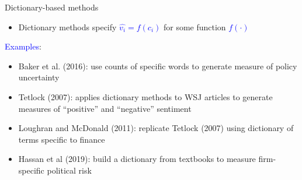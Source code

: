 \documentclass[english]{beamer}
\begin{document}
\begin{frame}{Dictionary-based methods}
\begin{itemize}
\setlength{\itemsep}{1em}
\item Dictionary methods specify \textcolor{blue}{$\hat{v_i}=f (c_i)$} for some function \textcolor{blue}{$f(\cdot)$}

\end{itemize}

\vspace{12pt}

\textcolor{blue}{Examples}:

\vspace{7pt}

\begin{itemize}
\setlength{\itemsep}{1em}

\item Baker et al. (2016): use counts of specific words to generate measure of policy uncertainty

\item Tetlock (2007): applies dictionary methods to WSJ articles to generate measures of ``positive'' and ``negative'' sentiment

\item Loughran and McDonald (2011): replicate Tetlock (2007) using dictionary of terms specific to finance

\item Hassan et al (2019): build a dictionary from textbooks to measure firm-specific political risk


\end{itemize}
\end{frame}
\end{document}
